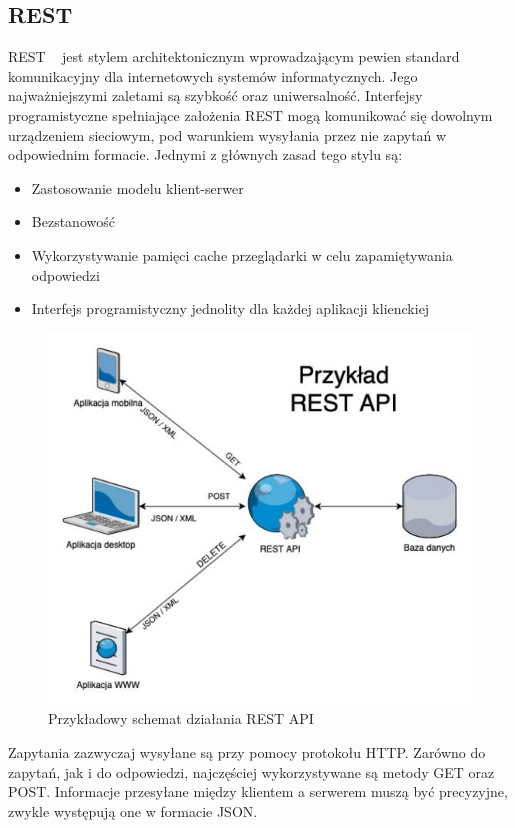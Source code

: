 \subsection{REST}
REST ~\cite{REST} jest stylem architektonicznym wprowadzającym pewien standard komunikacyjny dla internetowych systemów informatycznych. Jego najważniejszymi zaletami są szybkość oraz uniwersalność. Interfejsy programistyczne spełniające założenia REST mogą komunikować się dowolnym urządzeniem sieciowym, pod warunkiem wysyłania przez nie zapytań w odpowiednim formacie. Jednymi z głównych zasad tego stylu są:
\begin{itemize}
	\item Zastosowanie modelu klient-serwer
	\item Bezstanowość
	\item Wykorzystywanie pamięci cache przeglądarki w celu zapamiętywania odpowiedzi
	\item Interfejs programistyczny jednolity dla każdej aplikacji klienckiej
\end{itemize}
\begin{figure}[H]
	\centering\includegraphics[width=\textwidth]{figures/rest}
	\caption{Przykładowy schemat działania REST API~\cite{SchematRest}}\label{rys:rest}
\end{figure}

Zapytania zazwyczaj wysyłane są przy pomocy protokołu HTTP. Zarówno do zapytań, jak i do odpowiedzi, najczęściej wykorzystywane są metody GET oraz POST. Informacje przesyłane między klientem a serwerem muszą być precyzyjne, zwykle występują one w formacie JSON. 

